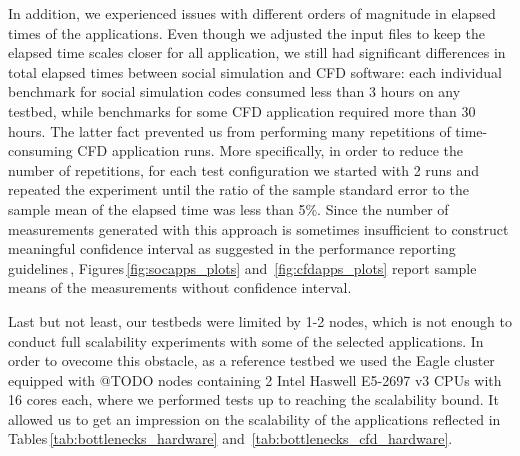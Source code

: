 In addition, we experienced issues with different orders of magnitude in elapsed times of the applications.
Even though we adjusted the input files to keep the elapsed time scales closer for all application,
we still had significant differences in total elapsed times between social simulation and CFD software:
each individual benchmark for social simulation codes consumed less than 3 hours on any testbed,
while benchmarks for some CFD application required more than 30 hours.
The latter fact prevented us from performing many repetitions of time-consuming CFD application runs.
More specifically, in order to reduce the number of repetitions, for each test configuration
we started with 2 runs and repeated the experiment %
until the ratio of the sample standard error to the sample mean of the elapsed time was less than 5\%.
Since the number of measurements generated with this approach
is sometimes insufficient to construct meaningful confidence interval as suggested in the performance reporting guidelines\,\cite{2015:Hoefler},
Figures\,\ref{fig:socapps_plots} and~\ref{fig:cfdapps_plots} report sample means of the measurements without confidence interval.

Last but not least,
our testbeds were limited by 1-2 nodes,
which is not enough to conduct full scalability experiments with some of the selected applications.
In order to ovecome this obstacle,
as a reference testbed we used the Eagle cluster equipped with @TODO nodes containing 2 Intel Haswell E5-2697 v3 CPUs with 16 cores each,
where we performed tests up to reaching the scalability bound.
It allowed us to get an impression on the scalability of the applications reflected in Tables\,\ref{tab:bottlenecks_hardware} and~\ref{tab:bottlenecks_cfd_hardware}.


